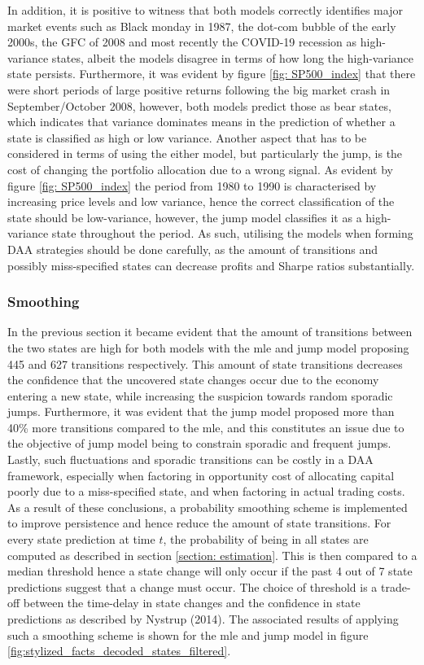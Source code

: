 In addition, it is positive to witness that both models correctly identifies major market events such as Black monday in 1987, the dot-com bubble of the early 2000s, the GFC of 2008 and most recently the COVID-19 recession as high-variance states, albeit the models disagree in terms of how long the high-variance state persists. Furthermore, it was evident by figure \ref{fig: SP500_index} that there were short periods of large positive returns following the big market crash in September/October 2008, however, both models predict those as bear states, which indicates that variance dominates means in the prediction of whether a state is classified as high or low variance. Another aspect that has to be considered in terms of using the either model, but particularly the jump, is the cost of changing the portfolio allocation due to a wrong signal. As evident by figure \ref{fig: SP500_index} the period from 1980 to 1990 is characterised by increasing price levels and low variance, hence the correct classification of the state should be low-variance, however, the jump model classifies it as a high-variance state throughout the period. As such, utilising the models when forming DAA strategies should be done carefully, as the amount of transitions and possibly miss-specified states can decrease profits and Sharpe ratios substantially.  

\subsubsection{Smoothing}
In the previous section it became evident that the amount of transitions between the two states are high for both models with the mle and jump model proposing 445 and 627 transitions respectively. This amount of state transitions decreases the confidence that the uncovered state changes occur due to the economy entering a new state, while increasing the suspicion towards random sporadic jumps. Furthermore, it was evident that the jump model proposed more than 40\% more transitions compared to the mle, and this constitutes an issue due to the objective of jump model being to constrain sporadic and frequent jumps. Lastly, such fluctuations and sporadic transitions can be costly in a DAA framework, especially when factoring in opportunity cost of allocating capital poorly due to a miss-specified state, and when factoring in actual trading costs. As a result of these conclusions, a probability smoothing scheme is implemented to improve persistence and hence reduce the amount of state transitions. For every state prediction at time $t$, the probability of being in all states are computed as described in section \ref{section: estimation}. This is then compared to a median threshold hence a state change will only occur if the past 4 out of 7 state predictions suggest that a change must occur. The choice of threshold is a trade-off between the time-delay in state changes and the confidence in state predictions as described by Nystrup (2014). The associated results of applying such a smoothing scheme is shown for the mle and jump model in figure \ref{fig:stylized_facts_decoded_states_filtered}.


